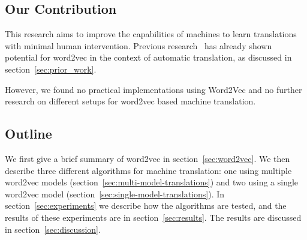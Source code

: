 \subsection{Our Contribution}
This research aims to improve the capabilities of machines to learn translations with minimal human intervention. Previous research~\cite{mikolov2013exploiting, wolf2014joint} has already shown potential for word2vec in the context of automatic translation, as discussed in section~\ref{sec:prior_work}.

However, we found no practical implementations using Word2Vec and no further research on different setups for word2vec based machine translation.

\subsection{Outline}
We first give a brief summary of word2vec in section~\ref{sec:word2vec}. We then describe three different algorithms for machine translation: one using multiple word2vec models (section~\ref{sec:multi-model-translations}) and two using a single word2vec model (section~\ref{sec:single-model-translations}). In section~\ref{sec:experiments} we describe how the algorithms are tested, and the results of these experiments are in section~\ref{sec:results}. The results are discussed in section~\ref{sec:discussion}.
